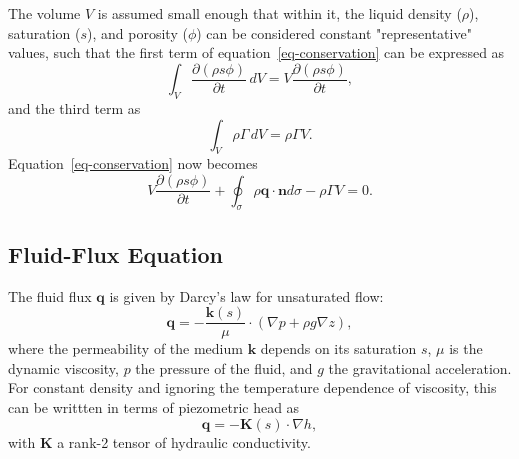 \documentclass[fleqn]{article}
\begin{document}
The volume $V$ is assumed small enough that within it, the
liquid density ($\rho$), saturation ($s$), and porosity ($\phi$) can be
considered constant "representative" values, such that the first term of
equation~\ref{eq-conservation} can be expressed as
\begin{equation}
  \int_V \frac{\partial (\rho s \phi)}{\partial t} \,dV = 
  V \frac{\partial (\rho s \phi)}{\partial t},
\end{equation}
and the third term as
\begin{equation}
  \int_V \rho \Gamma \,dV = \rho \Gamma V.
\end{equation}
Equation~\ref{eq-conservation} now becomes
\begin{equation}
  V \frac{\partial (\rho s \phi)}{\partial t} +
  \oint_\sigma \rho \mathbf{q} \cdot \mathbf{n} d\sigma -
  \rho \Gamma V = 0.
\end{equation}

\subsection{Fluid-Flux Equation}
The fluid flux $\mathbf{q}$ is given by Darcy's law for unsaturated flow:
\begin{equation}
  \mathbf{q} = - \frac{\mathbf{k}(s)}{\mu} \cdot ( \nabla p + \rho g \nabla z ),
\end{equation}
where the permeability of the medium $\mathbf{k}$ depends on its saturation $s$,
$\mu$ is the dynamic viscosity, $p$ the pressure of the fluid, and $g$ the
gravitational acceleration. For constant density and ignoring the temperature
dependence of viscosity, this can be writtten in terms of piezometric head as
\begin{equation}
  \mathbf{q} = - \mathbf{K}(s) \cdot \nabla h,
  \label{eq-unsat-darcy-flux}
\end{equation}
with $\mathbf{K}$ a rank-2 tensor of hydraulic conductivity. 
\end{document}
